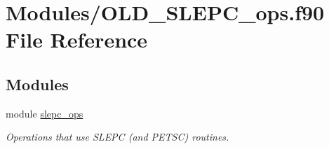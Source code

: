 \hypertarget{OLD__SLEPC__ops_8f90}{}\section{Modules/\+O\+L\+D\+\_\+\+S\+L\+E\+P\+C\+\_\+ops.f90 File Reference}
\label{OLD__SLEPC__ops_8f90}
\subsection*{Modules}
\begin{DoxyCompactItemize}
\item 
module \hyperlink{namespaceslepc__ops}{slepc\+\_\+ops}
\begin{DoxyCompactList}\small\item\em Operations that use S\+L\+E\+PC (and P\+E\+T\+SC) routines. \end{DoxyCompactList}\end{DoxyCompactItemize}
